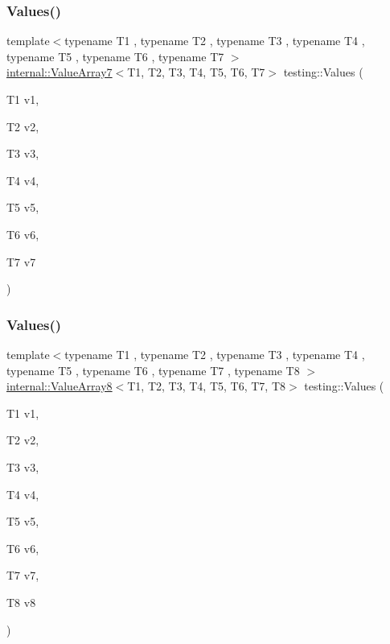 \subsubsection{\texorpdfstring{Values()}{Values()}\hspace{0.1cm}{\footnotesize\ttfamily [8/51]}}
{\footnotesize\ttfamily template$<$typename T1 , typename T2 , typename T3 , typename T4 , typename T5 , typename T6 , typename T7 $>$ \\
\mbox{\hyperlink{classtesting_1_1internal_1_1_value_array7}{internal\+::\+Value\+Array7}}$<$T1, T2, T3, T4, T5, T6, T7$>$ testing\+::\+Values (\begin{DoxyParamCaption}\item[{T1}]{v1,  }\item[{T2}]{v2,  }\item[{T3}]{v3,  }\item[{T4}]{v4,  }\item[{T5}]{v5,  }\item[{T6}]{v6,  }\item[{T7}]{v7 }\end{DoxyParamCaption})}

\mbox{\label{namespacetesting_a1eda12e6518e4c51c1bb2e7cc9d31ffa}} 
\subsubsection{\texorpdfstring{Values()}{Values()}\hspace{0.1cm}{\footnotesize\ttfamily [9/51]}}
{\footnotesize\ttfamily template$<$typename T1 , typename T2 , typename T3 , typename T4 , typename T5 , typename T6 , typename T7 , typename T8 $>$ \\
\mbox{\hyperlink{classtesting_1_1internal_1_1_value_array8}{internal\+::\+Value\+Array8}}$<$T1, T2, T3, T4, T5, T6, T7, T8$>$ testing\+::\+Values (\begin{DoxyParamCaption}\item[{T1}]{v1,  }\item[{T2}]{v2,  }\item[{T3}]{v3,  }\item[{T4}]{v4,  }\item[{T5}]{v5,  }\item[{T6}]{v6,  }\item[{T7}]{v7,  }\item[{T8}]{v8 }\end{DoxyParamCaption})}

